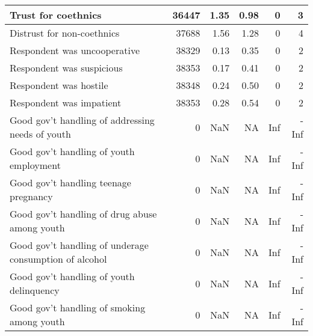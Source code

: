 \begin{tabular}{l|r|r|r|r|r}
\hline
Trust for coethnics & 36447 & 1.35 & 0.98 & 0 & 3\\
\hline
Distrust for non-coethnics & 37688 & 1.56 & 1.28 & 0 & 4\\
\hline
Respondent was uncooperative & 38329 & 0.13 & 0.35 & 0 & 2\\
\hline
Respondent was suspicious & 38353 & 0.17 & 0.41 & 0 & 2\\
\hline
Respondent was hostile & 38348 & 0.24 & 0.50 & 0 & 2\\
\hline
Respondent was impatient & 38353 & 0.28 & 0.54 & 0 & 2\\
\hline
Good gov't handling of addressing needs of youth & 0 & NaN & NA & Inf & -Inf\\
\hline
Good gov't handling of youth employment & 0 & NaN & NA & Inf & -Inf\\
\hline
Good gov't handling teenage pregnancy & 0 & NaN & NA & Inf & -Inf\\
\hline
Good gov't handling of drug abuse among youth & 0 & NaN & NA & Inf & -Inf\\
\hline
Good gov't handling of underage consumption of alcohol & 0 & NaN & NA & Inf & -Inf\\
\hline
Good gov't handling of youth delinquency & 0 & NaN & NA & Inf & -Inf\\
\hline
Good gov't handling of smoking among youth & 0 & NaN & NA & Inf & -Inf\\
\hline
\end{tabular}
\endgroup{}
